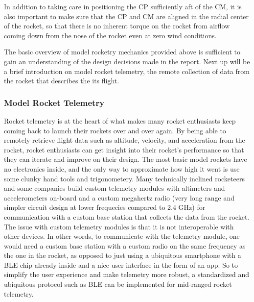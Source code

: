 \documentclass{workreport}
\begin{document}
\begin{body}
	In addition to taking care in positioning the CP sufficiently aft of the CM, it is also important to make sure that the CP and CM are aligned in the radial center of the rocket, so that there is no inherent torque on the rocket from airflow coming down from the nose of the rocket even at zero wind conditions.

	The basic overview of model rocketry mechanics provided above is sufficient to gain an understanding of the design decisions made in the report. Next up will be a brief introduction on model rocket telemetry, the remote collection  of data from the rocket that describes the its flight.

	\subsubsection{Model Rocket Telemetry}
	Rocket telemetry is at the heart of what makes many rocket enthusiasts keep coming back to launch their rockets over and over again. By being able to remotely retrieve flight data such as altitude, velocity, and acceleration from the rocket, rocket enthusiasts can get insight into their rocket's performance so that they can iterate and improve on their design. The most basic model rockets have no electronics inside, and the only way to approximate how high it went is use some clunky hand tools and trigonometery. Many technically inclined rocketeers and some companies build custom telemetry modules with altimeters and accelerometers on-board and a custom megahertz radio (very long range and simpler circuit design at lower frequecies compared to 2.4 GHz) for communication with a custom base station that collects the data from the rocket. The issue with custom telemetry modules is that it is not interoperable with other devices. In other words, to communicate with the telemetry module, one would need a custom base station with a custom radio on the same frequency as the one in the rocket, as opposed to just using a ubiquitous smartphone with a BLE chip already inside and a nice user interface in the form of an app. So to simplify the user experience and make telemetry more robust, a standardized and ubiquitous protocol such as BLE can be implemented for mid-ranged rocket telemetry.


\end{body}
\end{document}
